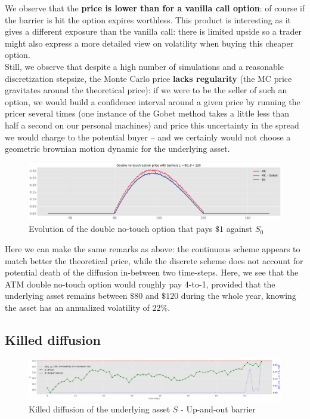 We observe that the \textbf{price is lower than for a vanilla call option}: of course if the barrier is hit the option expires worthless. This product is interesting as it gives a different exposure than the vanilla call: there is limited upside so a trader might also express a more detailed view on volatility when buying this cheaper option.\\

Still, we observe that despite a high number of simulations and a reasonable discretization stepsize, the Monte Carlo price \textbf{lacks regularity} (the MC price gravitates around the theoretical price): if we were to be the seller of such an option, we would build a confidence interval around a given price by running the pricer several times (one instance of the Gobet method takes a little less than half a second on our personal machines) and price this uncertainty in the spread we would charge to the potential buyer -- and we certainly would not choose a geometric brownian motion dynamic for the underlying asset.

\begin{figure}[H]
    \centering
    \includegraphics[width=1\linewidth]{img/dnt_mc.pdf}
    \caption{Evolution of the double no-touch option that pays $\$1$ against $S_0$}
    \label{fig:doublenotouchmc}
\end{figure}

Here we can make the same remarks as above: the continuous scheme appears to match better the theoretical price, while the discrete scheme does not account for potential death of the diffusion in-between two time-steps.\newline
Here, we see that the ATM double no-touch option would roughly pay 4-to-1, provided that the underlying asset remains between $\$80$ and $\$120$ during the whole year, knowing the asset has an annualized volatility of $22\%$.

\subsection{Killed diffusion}

\begin{figure}[H]
    \centering
    \includegraphics[width=1\linewidth]{img/barrierupandout.png}
    \caption{Killed diffusion of the underlying asset $S$ - Up-and-out barrier}
    \label{fig:barrier}
\end{figure}

